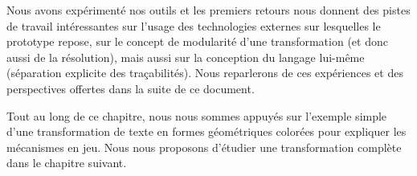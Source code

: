 Nous avons expérimenté nos outils et les premiers retours nous donnent des
pistes de travail intéressantes sur l'usage des technologies externes sur
lesquelles le prototype repose, sur le concept de modularité d'une
transformation (et donc aussi de la résolution), mais aussi sur la conception
du langage lui-même (séparation explicite des traçabilités). Nous reparlerons
de ces expériences et des perspectives offertes dans la suite de ce document.

Tout au long de ce chapitre, nous nous sommes appuyés sur l'exemple simple
d'une transformation de texte en formes géométriques colorées pour expliquer
les mécanismes en jeu. Nous nous proposons d'étudier une transformation
complète dans le chapitre suivant.%

